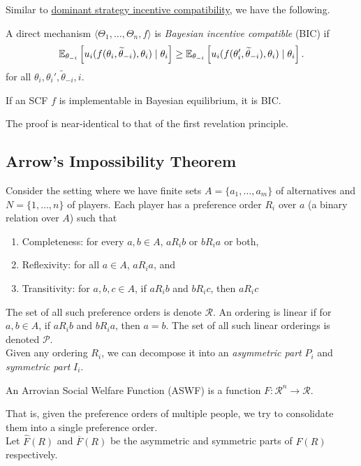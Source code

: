 	Similar to \hyperref[def: dsic]{dominant strategy incentive compatibility}, we have the following.

	\begin{fdef}
		\label{def: bic}
		A direct mechanism $\langle \Theta_1,\ldots,\Theta_n,f\rangle$ is \emph{Bayesian incentive compatible} (BIC) if
		\begin{equation}
			\label{eqn: dsic}
			\mathbb{E}_{\theta_{-i}} \left[ u_i(f(\theta_i,\widetilde{\theta}_{-i}),\theta_i) \mid \theta_i \right] \ge \mathbb{E}_{\theta_{-i}} \left[ u_i(f(\theta_i',\widetilde{\theta}_{-i}),\theta_i) \mid \theta_i \right].
		\end{equation}
		for all $\theta_i,\theta_i',\widetilde{\theta}_{-i},i$.
	\end{fdef}

	\begin{ftheo}
		If an SCF $f$ is implementable in Bayesian equilibrium, it is BIC.
	\end{ftheo}

	The proof is near-identical to that of the first revelation principle.

\subsection{Arrow's Impossibility Theorem}

	Consider the setting where we have finite sets $A = \{a_1,\ldots,a_m\}$ of alternatives and $N = \{1,\ldots,n\}$ of players. Each player has a preference order $R_i$ over $a$ (a binary relation over $A$) such that
	\begin{enumerate}
		\item Completeness: for every $a,b \in A$, $a R_i b$ or $b R_i a$ or both,
		\item Reflexivity: for all $a \in A$, $a R_i a$, and
		\item Transitivity: for $a,b,c \in A$, if $a R_i b$ and $b R_i c$, then $a R_i c$
	\end{enumerate}
	The set of all such preference orders is denote $\mathcal{R}$. An ordering is linear if for $a,b \in A$, if $aR_i b$ and $bR_i a$, then $a = b$. The set of all such linear orderings is denoted $\mathcal{P}$.\\

	Given any ordering $R_i$, we can decompose it into an \emph{asymmetric part} $P_i$ and \emph{symmetric part} $I_i$.

	\begin{fdef}
		An Arrovian Social Welfare Function (ASWF) is a function $F : \mathcal{R}^n \to \mathcal{R}$.
	\end{fdef}
	That is, given the preference orders of multiple people, we try to consolidate them into a single preference order.\\
	Let $\hat{F}(R)$ and $\overline{F}(R)$ be the asymmetric and symmetric parts of $F(R)$ respectively.

